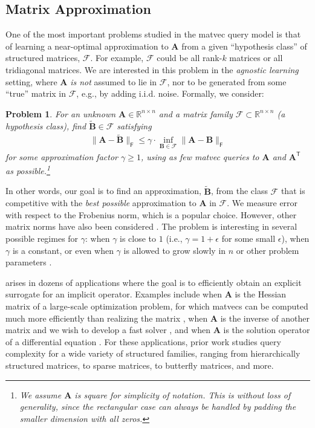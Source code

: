 \documentclass{article}[11pt]
\newtheorem{problem}{Problem}
\theoremstyle{definition}
\newcommand{\bv}[1]{\boldsymbol{\mathbf{#1}}}
\newcommand{\R}{\mathbb{R}}
\newcommand{\Fro}{\mathsf{F}}
\newcommand{\transpose}{\mathsf{T}}
\newcommand{\family}{\mathcal{F}}
\begin{document}
\subsection{Matrix Approximation}
One of the most important problems studied in the matvec query model is that of learning a near-optimal approximation to $\bv{A}$ from a given ``hypothesis class'' of structured matrices, $\family$. For example, $\mathcal{F}$ could be all rank-$k$ matrices or all tridiagonal matrices. We are interested in this problem in the \emph{agnostic learning} setting, where $\bv{A}$ \emph{is not} assumed to lie in $\family$, nor to be generated from some ``true'' matrix in $\mathcal{F}$, e.g., by adding i.i.d. noise. Formally, we consider:
\begin{problem}
\label{prob:intro}
            For an unknown $\bv{A} \in \R^{n \times n}$ and a matrix family $\family \subset \R^{n \times n}$ (a hypothesis class), find $\bv{\tilde{B}}\in \mathcal{F}$ satisfying
            \begin{align*}
                \|\bv{A} - \bv{\tilde{B}}\|_{\Fro} \leq \gamma \cdot \inf_{\bv{B}\in \family}\|\bv{A} - \bv{B}\|_{\Fro}
            \end{align*}
            for some approximation factor $\gamma \geq 1$, using as few matvec queries to $\bv{A}$ and $\bv{A}^\transpose$ as possible.\footnote{We assume $\bv{A}$ is square for simplicity of notation. This is without loss of generality, since the rectangular case can always be handled by padding the smaller dimension with all zeros.}
\end{problem}
In other words, our goal is to find an approximation, $\bv{\tilde{B}}$, from the class $\mathcal{F}$ that is competitive with the \emph{best possible} approximation to $\bv{A}$ in $\family$.
We measure error with respect to the Frobenius norm, which is a popular choice. However, other matrix norms have also been considered \cite{KressnerMasseiRobol:2019,MuscoMusco:2015}. The problem is interesting in several possible regimes for $\gamma$:  when $\gamma$ is close to $1$ (i.e., $\gamma = 1+\epsilon$ for some small $\epsilon$), when $\gamma$ is a constant, or even when $\gamma$ is allowed to grow slowly in $n$ or other problem parameters \cite{AmselChenHalikias:2025}.

 arises in dozens of applications where the goal is to efficiently obtain an explicit surrogate for an implicit operator. Examples include when $\bv{A}$ is the Hessian matrix of a large-scale optimization problem, for which matvecs can be computed much more efficiently than realizing the matrix \cite{Pearlmutter:1994,DauphinVriesBengio:2015}, when $\bv{A}$ is the inverse of another matrix and we wish to develop a fast solver \cite{LinLuYing:2011,Martinsson:2016}, and when $\bv{A}$ is the solution operator of a differential equation \cite{BoulleTownsend:2023}. For these applications, prior work studies query complexity for a wide variety of structured families, ranging from hierarchically structured matrices, to sparse matrices, to butterfly matrices, and more. 
\end{document}
